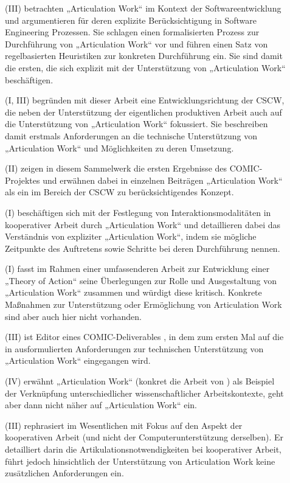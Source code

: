 \begin{description}
	\item[\citet{Mi91}] (III) betrachten „Articulation Work“ im Kontext der Softwareentwicklung und argumentieren für deren explizite Berücksichtigung in Software Engineering Prozessen. Sie schlagen einen formalisierten Prozess zur Durchführung von „Articulation Work“ vor und führen einen Satz von regelbasierten Heuristiken zur konkreten Durchführung ein. Sie sind damit die ersten, die sich explizit mit der Unterstützung von „Articulation Work“ beschäftigen.
	\item[\citet{Schmidt92}] (I, III) begründen mit dieser Arbeit eine Entwicklungsrichtung der \gls{CSCW}, die neben der Unterstützung der eigentlichen produktiven Arbeit auch auf die Unterstützung von „Articulation Work“ fokussiert. Sie beschreiben damit erstmals Anforderungen an die technische Unterstützung von „Articulation Work“ und Möglichkeiten zu deren Umsetzung.
	\item[\citet{Bannon93}] (II) zeigen in diesem Sammelwerk die ersten Ergebnisse des COMIC-Projektes \citep{Rodden95} und erwähnen dabei in einzelnen Beiträgen „Articulation Work“ als ein im Bereich der \gls{CSCW} zu berücksichtigendes Konzept.
	\item[\citet{Corbin93}] (I) beschäftigen sich mit der Festlegung von Interaktionsmodalitäten in kooperativer Arbeit durch „Articulation Work“ und detaillieren dabei das Verständnis von expliziter „Articulation Work“, indem sie mögliche Zeitpunkte des Auftretens sowie Schritte bei deren Durchführung nennen.
	\item[\citet{Strauss93}] (I) fasst im Rahmen einer umfassenderen Arbeit zur Entwicklung einer „Theory of Action“ seine Überlegungen zur Rolle und Ausgestaltung von „Articulation Work“ zusammen und würdigt diese kritisch. Konkrete Maßnahmen zur Unterstützung oder Ermöglichung von Articulation Work sind aber auch hier nicht vorhanden.
	\item[\citet{Bowers94}] (III) ist Editor eines COMIC-Deliverables \citep{Rodden95}, in dem zum ersten Mal auf die in \citep{Schmidt96} ausformulierten Anforderungen zur technischen Unterstützung von „Articulation Work“ eingegangen wird.
	\item[\citet{Lenoir94}] (IV) erwähnt „Articulation Work“ (konkret die Arbeit von \citet{Fujimura87}) als Beispiel der Verknüpfung unterschiedlicher wissenschaftlicher Arbeitskontexte, geht aber dann nicht näher auf „Articulation Work“ ein.
	\item[\citet{Schmidt94}] (III) rephrasiert im Wesentlichen \citep{Schmidt90} mit Fokus auf den Aspekt der kooperativen Arbeit (und nicht der Computerunterstützung derselben). Er detailliert darin die Artikulationsnotwendigkeiten bei kooperativer Arbeit, führt jedoch hinsichtlich der Unterstützung von Articulation Work keine zusätzlichen Anforderungen ein.

\end{description}
